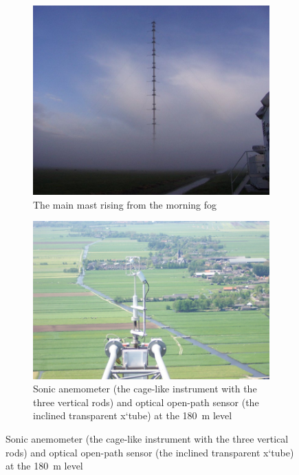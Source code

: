 \documentclass[a4paper,11pt]{kth-mag}
\begin{document}
\begin{figure}
    \centering
        \begin{subfigure}[c]{0.48\textwidth}
        \centering
		\includegraphics[width=\textwidth]{images/cabauw_tower}
		\caption{The main mast rising from the morning fog}
		\label{fig:cabauw_main_mast}
    \end{subfigure}
    \hfill
    \begin{subfigure}[c]{0.48\textwidth}
        \centering
		\includegraphics[width=\textwidth]{images/cabauw_turbulence_instruments}
		\caption{Sonic anemometer (the cage-like instrument with the three vertical rods) and optical open-path sensor (the inclined transparent x`tube) at the \SI{180}{\meter} level}
		\label{fig:cabauw_180m}
    \end{subfigure}
    

\end{figure}
\end{document}
